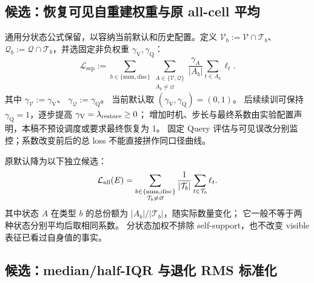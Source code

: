 \documentclass[11pt,UTF8,fontset=fandol]{ctexart}
\numberwithin{equation}{section}
\theoremstyle{definition}
\newcommand{\Vset}{\mathcal V}
\newcommand{\Qset}{\mathcal Q}
\newcommand{\TargetSet}{\mathcal T}
\begin{document}
\subsection{候选：恢复可见自重建权重与原 all-cell 平均}
通用分状态公式保留，以容纳当前默认和历史配置。定义
$\Vset_b:=\Vset\cap\TargetSet_b$、
$\Qset_b:=\Qset\cap\TargetSet_b$，并选固定非负权重
$\gamma_{\mathrm V},\gamma_{\mathrm Q}$：
\begin{equation}
 \mathcal L_{\mathrm{sep}}
 :=\sum_{b\in\{\mathrm{num},\mathrm{disc}\}}
   \sum_{\substack{A\in\{\Vset,\Qset\}\\A_b\ne\varnothing}}
    \frac{\gamma_A}{|A_b|}\sum_{t\in A_b}\ell_t.
 \label{eq:alt:separate-state-loss}
\end{equation}
其中 $\gamma_{\Vset}:=\gamma_{\mathrm V}$、
$\gamma_{\Qset}:=\gamma_{\mathrm Q}$。
当前默认取 $(\gamma_{\mathrm V},\gamma_{\mathrm Q})=(0,1)$。
后续续训可保持 $\gamma_{\mathrm Q}=1$，逐步提高 $\gamma_{\mathrm V}=\lambda_{\rm restore}\ge0$；
增加时机、步长与最终系数由实验配置声明，本稿不预设调度或要求最终恢复为 1。
固定 Query 评估与可见误改分别监控；系数改变前后的总 loss 不能直接拼作同口径曲线。

原默认降为以下独立候选：
\begin{equation}
 \mathcal L_{\rm all}(E)=\sum_{\substack{b\in\{\mathrm{num},\mathrm{disc}\}\\\TargetSet_b\ne\varnothing}}
 \frac{1}{|\TargetSet_b|}\sum_{t\in\TargetSet_b}\ell_t.
 \label{v53q:eq:all-cell-candidate}
\end{equation}
其中状态 $A$ 在类型 $b$ 的总份额为 $|A_b|/|\TargetSet_b|$，随实际数量变化；
它一般不等于两种状态分别平均后取相同系数。
分状态加权不排除 self-support，也不改变 visible 表征已看过自身值的事实。

\subsection{候选：median/half-IQR 与退化 RMS 标准化}\label{v53c:robust-option}
\end{document}
